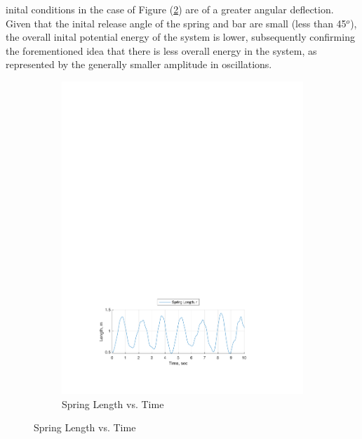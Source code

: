 \documentclass[12pt]{report}
\begin{document}
\begin{flushleft}
inital conditions in the case of Figure (\ref{fig:spring:6-3}) are of a greater
angular deflection. Given that the inital release angle
of the spring and bar are small (less than 45$^o$), the overall inital potential energy of the
system is lower, subsequently confirming the forementioned idea that there is less overall energy in the system,
as represented by the generally smaller amplitude in oscillations.
\begin{figure}[!ht]
\caption{Numerical Solution Motion Behavior Plot, ($\theta_o:~\sfrac{\pi}{6},~\phi_o:~\sfrac{\pi}{3}$)}
\begin{subfigure}[t]{\textwidth}
  \includegraphics[center]{spring_6-3}
  \caption{Spring Length vs. Time}
  \label{fig:spring:6-3}
\end{subfigure}
\end{figure}
\begin{figure}[!ht] \ContinuedFloat
\begin{subfigure}[t]{\textwidth}

\end{subfigure}
\end{figure}
\end{flushleft}
\end{document}
